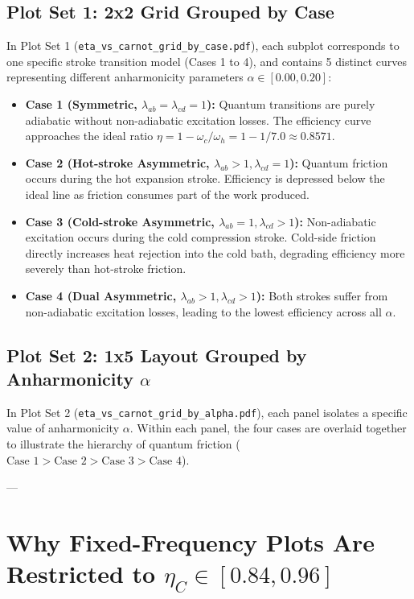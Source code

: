 \documentclass[11pt,a4paper]{article}
\begin{document}
\subsection{Plot Set 1: 2x2 Grid Grouped by Case}
In Plot Set 1 (\texttt{eta\_vs\_carnot\_grid\_by\_case.pdf}), each subplot corresponds to one specific stroke transition model (Cases 1 to 4), and contains 5 distinct curves representing different anharmonicity parameters $\alpha \in [0.00, 0.20]$:
\begin{itemize}
    \item \textbf{Case 1 (Symmetric, $\lambda_{ab}=\lambda_{cd}=1$):} Quantum transitions are purely adiabatic without non-adiabatic excitation losses. The efficiency curve approaches the ideal ratio $\eta = 1 - \omega_c/\omega_h = 1 - 1/7.0 \approx 0.8571$.
    \item \textbf{Case 2 (Hot-stroke Asymmetric, $\lambda_{ab} > 1, \lambda_{cd}=1$):} Quantum friction occurs during the hot expansion stroke. Efficiency is depressed below the ideal line as friction consumes part of the work produced.
    \item \textbf{Case 3 (Cold-stroke Asymmetric, $\lambda_{ab}=1, \lambda_{cd} > 1$):} Non-adiabatic excitation occurs during the cold compression stroke. Cold-side friction directly increases heat rejection into the cold bath, degrading efficiency more severely than hot-stroke friction.
    \item \textbf{Case 4 (Dual Asymmetric, $\lambda_{ab} > 1, \lambda_{cd} > 1$):} Both strokes suffer from non-adiabatic excitation losses, leading to the lowest efficiency across all $\alpha$.
\end{itemize}

\subsection{Plot Set 2: 1x5 Layout Grouped by Anharmonicity $\alpha$}
In Plot Set 2 (\texttt{eta\_vs\_carnot\_grid\_by\_alpha.pdf}), each panel isolates a specific value of anharmonicity $\alpha$. Within each panel, the four cases are overlaid together to illustrate the hierarchy of quantum friction ($\text{Case 1} > \text{Case 2} > \text{Case 3} > \text{Case 4}$).

---

\section{Why Fixed-Frequency Plots Are Restricted to $\eta_C \in [0.84, 0.96]$}
\end{document}
